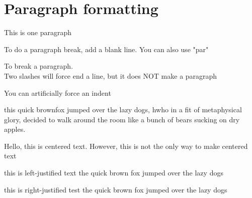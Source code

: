 \documentclass[12pt]{report}
\begin{document}
\chapter{Paragraph formatting}
\setlength{\parindent}{10ex} %
\setlength{\parskip}{1em} %


This is one paragraph 

To do a paragraph break, add a blank line. You can also use "par"\par 
To break a paragraph.\\ 
Two slashes will force end a line, but it does NOT make a paragraph 

\indent \indent You can artificially force an indent 

this quick brownfox jumped over the lazy dogs, hwho in a fit of metaphysical glory, decided to walk around the room like a bunch of bears sucking on dry apples. 

\begin{center}
Hello, this is centered text. However, this is not the only way to make centered text
\end{center}

\begin{flushleft}
this is left-justified text the quick brown fox jumped over the lazy dogs 
\end{flushleft}

\begin{flushright}
this is right-justified test the quick brown fox jumped over the lazy dogs 
\end{flushright}
\end{document}
